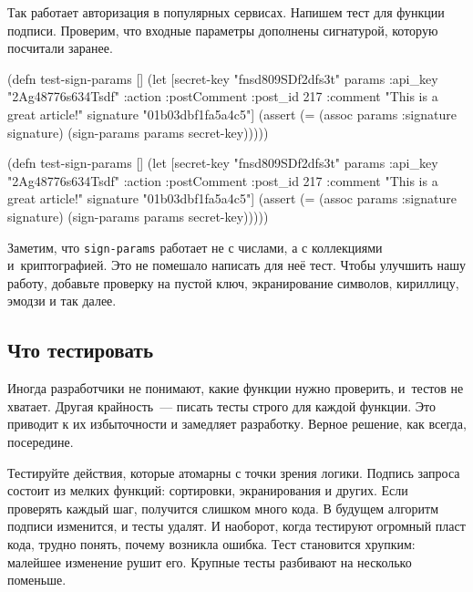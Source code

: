 
Так работает авторизация в популярных сервисах. Напишем тест для функции
подписи. Проверим, что входные параметры дополнены сигнатурой, которую посчитали
заранее.

\label{hmac-sha256}

\ifx\devicetype\mobile

\begin{english}
  \begin{clojure}
(defn test-sign-params []
  (let [secret-key "fnsd809SDf2dfs3t"
        params
        {:api_key "2Ag48776s634Tsdf"
         :action :postComment
         :post_id 217
         :comment
         "This is a great article!"}
        signature "01b03dbf1fa5a4c5"]
    (assert
      (= (assoc params
           :signature signature)
         (sign-params params
           secret-key)))))
  \end{clojure}
\end{english}

\else

\begin{english}
  \begin{clojure}
(defn test-sign-params []
  (let [secret-key "fnsd809SDf2dfs3t"
        params {:api_key "2Ag48776s634Tsdf"
                :action :postComment
                :post_id 217
                :comment "This is a great article!"}
        signature "01b03dbf1fa5a4c5"]
    (assert (= (assoc params :signature signature)
               (sign-params params secret-key)))))
  \end{clojure}
\end{english}

\fi

Заметим, что \verb|sign-params| работает не с числами, а с коллекциями
и~криптографией. Это не помешало написать для неё тест. Чтобы улучшить нашу
работу, добавьте проверку на пустой ключ, экранирование символов, кириллицу,
эмодзи и так далее.

\subsection{Что тестировать}

Иногда разработчики не понимают, какие функции нужно проверить, и~тестов не
хватает. Другая крайность~--- писать тесты строго для каждой функции. Это
приводит к их избыточности и замедляет разработку. Верное решение, как всегда,
посередине.

Тестируйте действия, которые атомарны с точки зрения логики. Подпись запроса
состоит из мелких функций: сортировки, экранирования и других. Если проверять
каждый шаг, получится слишком много кода. В будущем алгоритм подписи изменится,
и тесты удалят. И наоборот, когда тестируют огромный пласт кода, трудно понять,
почему возникла ошибка. Тест становится хрупким: малейшее изменение рушит
его. Крупные тесты разбивают на несколько поменьше.

